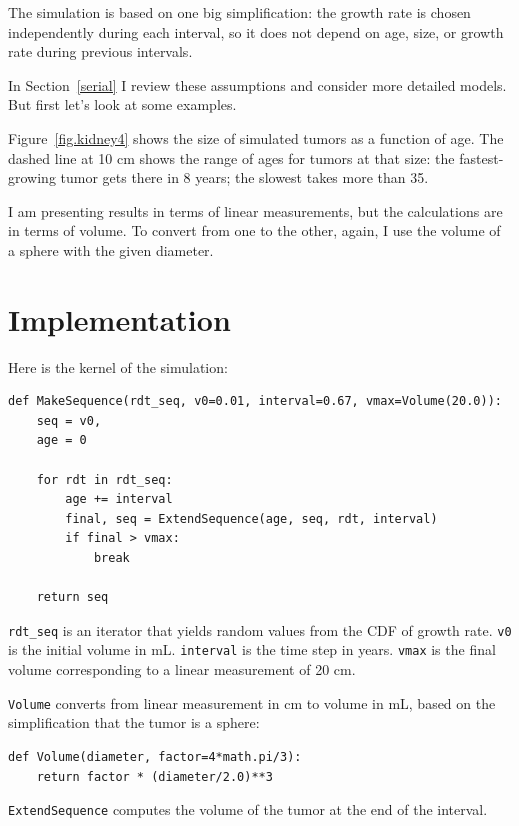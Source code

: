 \documentclass[12pt]{book}
\begin{document}
The simulation is based on one big simplification:
the growth rate is chosen independently during each interval,
so it does not depend on age, size, or growth rate during
previous intervals.

In Section~\ref{serial} I review these assumptions and
consider more detailed models.  But first let's look at some
examples.

Figure~\ref{fig.kidney4} shows 
the size of simulated tumors as a function of
age.  The dashed line at 10 cm shows the range of ages for tumors at
that size: the fastest-growing tumor gets there in 8 years; the
slowest takes more than 35.

I am presenting results in terms of linear measurements, but the
calculations are in terms of volume.  To convert from one to the
other, again, I use the volume of a sphere with the given
diameter.


\section{Implementation}

Here is the kernel of the simulation:

\begin{verbatim}
def MakeSequence(rdt_seq, v0=0.01, interval=0.67, vmax=Volume(20.0)):
    seq = v0,
    age = 0

    for rdt in rdt_seq:
        age += interval
        final, seq = ExtendSequence(age, seq, rdt, interval)
        if final > vmax:
            break

    return seq
\end{verbatim}

\verb"rdt_seq" is an iterator that yields 
random values from the CDF of growth rate.
{\tt v0} is the initial volume in mL.  {\tt interval} is the time step
in years.  {\tt vmax} is the final volume corresponding to a linear
measurement of 20 cm.

{\tt Volume} converts from linear measurement in cm to volume
in mL, based on the simplification that the tumor is a sphere:

\begin{verbatim}
def Volume(diameter, factor=4*math.pi/3):
    return factor * (diameter/2.0)**3
\end{verbatim}

{\tt ExtendSequence} computes the volume of the tumor at the
end of the interval.
\end{document}
